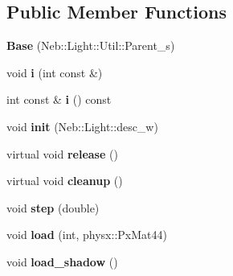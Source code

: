 \subsection*{Public Member Functions}
\begin{DoxyCompactItemize}
\item 
\hypertarget{classNeb_1_1Light_1_1Base_ab76457ec9dca523cd4e24f71b2602139}{{\bfseries Base} (Neb\-::\-Light\-::\-Util\-::\-Parent\-\_\-s)}\label{classNeb_1_1Light_1_1Base_ab76457ec9dca523cd4e24f71b2602139}

\item 
\hypertarget{classNeb_1_1Light_1_1Base_a8664ef276ed571f179c7ebca9851f01a}{void {\bfseries i} (int const \&)}\label{classNeb_1_1Light_1_1Base_a8664ef276ed571f179c7ebca9851f01a}

\item 
\hypertarget{classNeb_1_1Light_1_1Base_afccfb21c89edd6d0c223d12a2db8dab9}{int const \& {\bfseries i} () const }\label{classNeb_1_1Light_1_1Base_afccfb21c89edd6d0c223d12a2db8dab9}

\item 
\hypertarget{classNeb_1_1Light_1_1Base_af3845a68f8bfab1b2b27009d8f566100}{void {\bfseries init} (Neb\-::\-Light\-::desc\-\_\-w)}\label{classNeb_1_1Light_1_1Base_af3845a68f8bfab1b2b27009d8f566100}

\item 
\hypertarget{classNeb_1_1Light_1_1Base_ab8bb05e05acd9c4890962dc28992ed57}{virtual void {\bfseries release} ()}\label{classNeb_1_1Light_1_1Base_ab8bb05e05acd9c4890962dc28992ed57}

\item 
\hypertarget{classNeb_1_1Light_1_1Base_a1c35089c9803c5563518bc14b63edb83}{virtual void {\bfseries cleanup} ()}\label{classNeb_1_1Light_1_1Base_a1c35089c9803c5563518bc14b63edb83}

\item 
\hypertarget{classNeb_1_1Light_1_1Base_afca74a5b128bb6940214ecdeafa50d04}{void {\bfseries step} (double)}\label{classNeb_1_1Light_1_1Base_afca74a5b128bb6940214ecdeafa50d04}

\item 
\hypertarget{classNeb_1_1Light_1_1Base_ad621061e0be86708f0cbf7e300bc0c1e}{void {\bfseries load} (int, physx\-::\-Px\-Mat44)}\label{classNeb_1_1Light_1_1Base_ad621061e0be86708f0cbf7e300bc0c1e}

\item 
\hypertarget{classNeb_1_1Light_1_1Base_a903492950fc35bcfdafcbb91d42dddf2}{void {\bfseries load\-\_\-shadow} ()}\label{classNeb_1_1Light_1_1Base_a903492950fc35bcfdafcbb91d42dddf2}


\end{DoxyCompactItemize}
